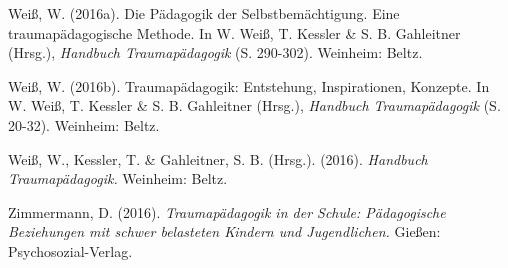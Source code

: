 \hang
Weiß, W. (2016a). Die Pädagogik der Selbstbemächtigung. Eine traumapädagogische Methode. In W. Weiß, T. Kessler \& S. B. Gahleitner (Hrsg.), \textit{Handbuch Traumapädagogik} (S. 290-302). Weinheim: Beltz.

\hang
Weiß, W. (2016b). Traumap{\"a}dagogik: Entstehung, Inspirationen, Konzepte. In W. Weiß, T. Kessler \& S. B. Gahleitner (Hrsg.), \textit{Handbuch Traumapädagogik} (S. 20-32). Weinheim: Beltz.

\hang
Weiß, W., Kessler, T. \& Gahleitner, S. B. (Hrsg.). (2016). \textit{Handbuch Traumapädagogik.} Weinheim: Beltz.

\hang
Zimmermann, D. (2016). \textit{Traumapädagogik in der Schule: Pädagogische Beziehungen mit schwer belasteten Kindern und Jugendlichen.} Gießen: Psychosozial-Verlag.

